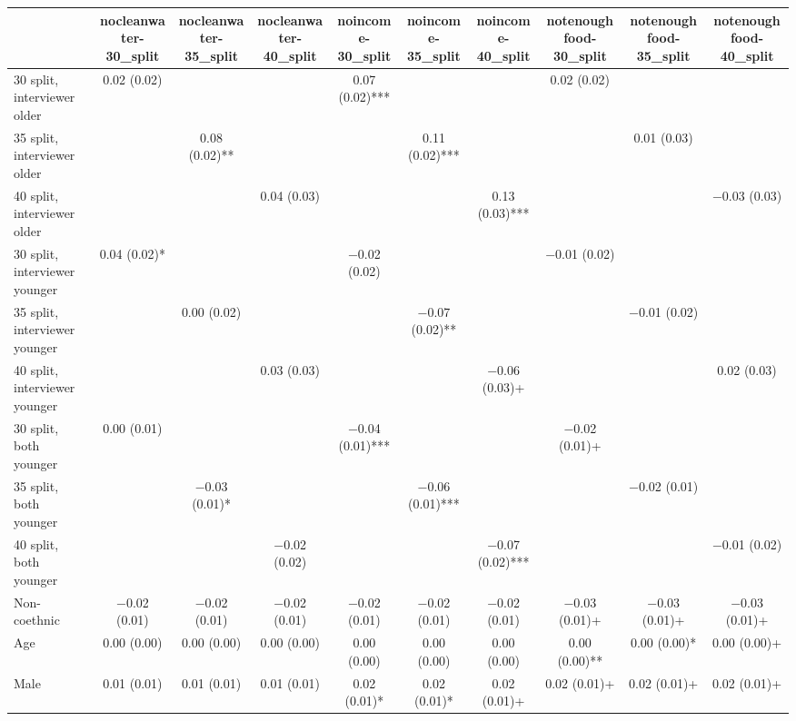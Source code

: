 \begin{table}
\centering
\begin{tabular}[t]{lccccccccc}
\toprule
  & nocleanwater-30\_split & nocleanwater-35\_split & nocleanwater-40\_split & noincome-30\_split & noincome-35\_split & noincome-40\_split & notenoughfood-30\_split & notenoughfood-35\_split & notenoughfood-40\_split\\
\midrule
30 split, interviewer older & \num{0.02} (\num{0.02}) &  &  & \num{0.07} (\num{0.02})*** &  &  & \num{0.02} (\num{0.02}) &  & \\
35 split, interviewer older &  & \num{0.08} (\num{0.02})** &  &  & \num{0.11} (\num{0.02})*** &  &  & \num{0.01} (\num{0.03}) & \\
40 split, interviewer older &  &  & \num{0.04} (\num{0.03}) &  &  & \num{0.13} (\num{0.03})*** &  &  & \num{-0.03} (\num{0.03})\\
30 split, interviewer younger & \num{0.04} (\num{0.02})* &  &  & \num{-0.02} (\num{0.02}) &  &  & \num{-0.01} (\num{0.02}) &  & \\
35 split, interviewer younger &  & \num{0.00} (\num{0.02}) &  &  & \num{-0.07} (\num{0.02})** &  &  & \num{-0.01} (\num{0.02}) & \\
40 split, interviewer younger &  &  & \num{0.03} (\num{0.03}) &  &  & \num{-0.06} (\num{0.03})+ &  &  & \num{0.02} (\num{0.03})\\
30 split, both younger & \num{0.00} (\num{0.01}) &  &  & \num{-0.04} (\num{0.01})*** &  &  & \num{-0.02} (\num{0.01})+ &  & \\
35 split, both younger &  & \num{-0.03} (\num{0.01})* &  &  & \num{-0.06} (\num{0.01})*** &  &  & \num{-0.02} (\num{0.01}) & \\
40 split, both younger &  &  & \num{-0.02} (\num{0.02}) &  &  & \num{-0.07} (\num{0.02})*** &  &  & \num{-0.01} (\num{0.02})\\
Non-coethnic & \num{-0.02} (\num{0.01}) & \num{-0.02} (\num{0.01}) & \num{-0.02} (\num{0.01}) & \num{-0.02} (\num{0.01}) & \num{-0.02} (\num{0.01}) & \num{-0.02} (\num{0.01}) & \num{-0.03} (\num{0.01})+ & \num{-0.03} (\num{0.01})+ & \num{-0.03} (\num{0.01})+\\
Age & \num{0.00} (\num{0.00}) & \num{0.00} (\num{0.00}) & \num{0.00} (\num{0.00}) & \num{0.00} (\num{0.00}) & \num{0.00} (\num{0.00}) & \num{0.00} (\num{0.00}) & \num{0.00} (\num{0.00})** & \num{0.00} (\num{0.00})* & \num{0.00} (\num{0.00})+\\
Male & \num{0.01} (\num{0.01}) & \num{0.01} (\num{0.01}) & \num{0.01} (\num{0.01}) & \num{0.02} (\num{0.01})* & \num{0.02} (\num{0.01})* & \num{0.02} (\num{0.01})+ & \num{0.02} (\num{0.01})+ & \num{0.02} (\num{0.01})+ & \num{0.02} (\num{0.01})+\\

\end{tabular}
\end{table}
